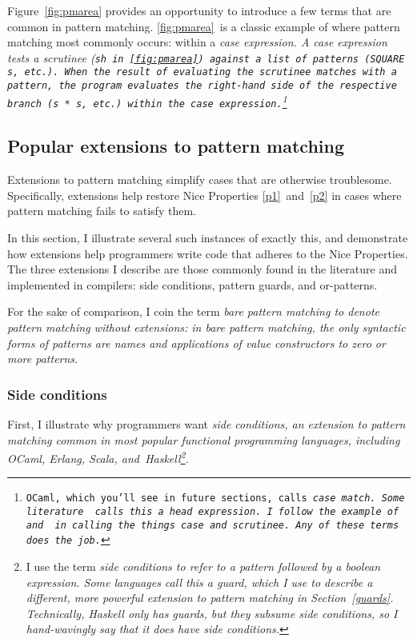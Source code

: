 \documentclass[manuscript,screen,review, 12pt, nonacm]{acmart}
\begin{document}
    Figure~\ref{fig:pmarea} provides an opportunity to introduce a few terms
    that are common in pattern matching. \ref{fig:pmarea}~is a classic example
    of where pattern matching most commonly occurs: within a \it{case}
    expression. A \it{case} expression tests a \it{scrutinee} (\tt{sh}
    in~\ref{fig:pmarea}) against a list of patterns (\tt{SQUARE s}, etc.). When
    the result of evaluating the scrutinee matches with a pattern, the program
    evaluates the right-hand side of the respective branch (\tt{s * s}, etc.)
    within the \it{case} expression.\footnote{OCaml, which you'll see in future
    sections, calls \it{case} \tt{match}. Some literature~\citep{guardproposal}
    calls this a \it{head expression}. I follow the example of~\citet{bpc} and
    \citet{maranget} in calling the things \it{case} and \it{scrutinee}. Any of
    these terms does the job.} 

\subsection{Popular extensions to pattern matching}
\label{extensions}

    Extensions to pattern matching simplify cases that are otherwise
    troublesome. Specifically, extensions help restore Nice Properties
    \ref{p1}~and~\ref{p2} in cases where pattern matching fails to satisfy them. 
    
    In this section, I illustrate several such instances of exactly this, and
    demonstrate how extensions help programmers write code that adheres to the
    Nice Properties. The three extensions I describe are those commonly found in
    the literature and implemented in compilers: side conditions, pattern
    guards, and or-patterns. 
    
    For the sake of comparison, I coin the term \it{bare pattern matching} to
    denote pattern matching \it{without} extensions: in bare pattern matching,
    the only syntactic forms of patterns are names and applications of value
    constructors to zero or more patterns. 



\subsubsection{Side conditions}

    First, I illustrate why programmers want \it{side conditions}, an extension
    to pattern matching common in most popular functional programming languages,
    including OCaml, Erlang, Scala, and~Haskell\footnote{I use the term \it{side
    conditions} to refer to a pattern followed by a boolean expression. Some
    languages call this a \it{guard}, which I use to describe a different, more
    powerful extension to pattern matching in Section~\ref{guards}.  
    Technically, Haskell \it{only} has guards, but they subsume side conditions,
    so I hand-wavingly say that it does have side conditions.}. 
    
\end{document}
